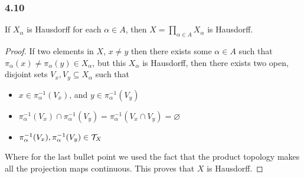\documentclass[../../main.tex]{subfiles}
\begin{document}
\subsubsection*{4.10}
\begin{wts}
    If $X_\alpha$ is Hausdorff for each $\alpha\in A$, then $X=\prod_{\alpha\in A}X_\alpha$ is Hausdorff.
\end{wts}
\newcommand{\pimap}[2]{\pi_{#1}({#2})}
\newcommand{\pinverse}[2]{\pi_{#1}^{-1}({#2})}
\begin{proof}
If two elements in $X$, $x\neq y$ then there exists some $\alpha\in A$ such that $\pimap{\alpha}{x}\neq\pimap{\alpha}{y}\in X_\alpha$, but this $X_\alpha$ is Hausdorff, then there exists two open, disjoint sets $V_x, V_y\subseteq X_\alpha$ such that
\begin{itemize}
    \item $x\in \pinverse{\alpha}{V_x}$, and $y\in \pinverse{\alpha}{V_y}$
    \item $\pinverse{\alpha}{V_x}\cap\pinverse{\alpha}{V_y} = \pinverse{\alpha}{V_x\cap V_y}=\varnothing$
    \item $\pinverse{\alpha}{V_x},\pinverse{\alpha}{V_y}\in \Tau_X$
\end{itemize}
Where for the last bullet point we used the fact that the product topology makes all the projection maps continuous. This proves that $X$ is Hausdorff.
\end{proof}
\end{document}
